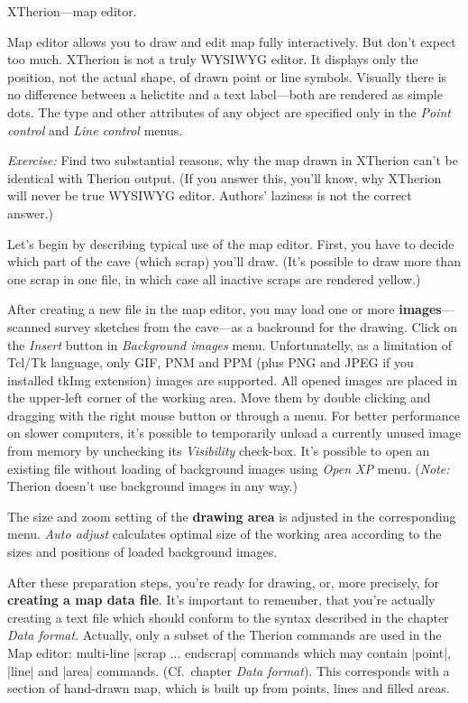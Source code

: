 \subsubchapter XTherion---map editor.

Map editor allows you to draw and edit map fully interactively.
But don't expect too much. XTherion is not a truly WYSIWYG editor. It 
displays only the position, not the actual shape, of drawn point or line 
symbols. Visually there is no difference between a helictite and a text 
label---both are rendered as simple dots. The type and other attributes of any 
object are specified only in the {\it Point control} and {\it Line control} menus.


\ifx\pdfoutput\undefined\else
\leavevmode{}\fi
{\it Exercise:} Find two substantial reasons, why the map drawn in XTherion can't be 
identical with Therion output. (If you answer this, you'll know, why XTherion 
will never be true WYSIWYG editor. Authors' laziness is not the correct 
answer.)

Let's begin by describing typical use of the map editor. First, you have 
to decide which part of the cave (which scrap) you'll draw. (It's possible to 
draw more than one scrap in one file, in which case all inactive scraps are rendered 
yellow.)

After creating a new file in the map editor, you may load one or more 
{\bf images}---scanned survey sketches from the cave---as a backround for 
the drawing. Click on the {\it Insert} button in {\it Background images} menu.
Unfortunatelly, as a limitation of Tcl/Tk language, only GIF, PNM and PPM 
(plus PNG and JPEG if you installed tkImg extension) images are supported. 
All opened images are placed in the upper-left corner of 
the working area. Move them by double clicking and dragging with the right 
mouse button or through a menu. For better performance on slower computers, 
it's possible to temporarily unload a currently unused image from memory 
by unchecking its {\it Visibility} check-box. It's possible to open an existing 
file without loading of background images using {\it Open XP} menu.
({\it Note:} Therion doesn't use background images in any way.)

The size and zoom setting of the {\bf drawing area} is adjusted in the 
corresponding menu. {\it Auto adjust} calculates optimal size of the working 
area according to the sizes and positions of loaded background images.

After these preparation steps, you're ready for drawing, or, more 
precisely, for {\bf creating a map data file}. It's important to remember, 
that you're actually creating a text file which should conform to the syntax 
described in the chapter {\it Data format}. Actually, only a subset of the 
Therion commands are used in the Map editor: multi-line |scrap ... endscrap|
commands which may contain |point|, |line| and |area| commands. (Cf.~chapter 
{\it Data format}). This corresponds with a section of hand-drawn map, which is 
built up from points, lines and filled areas.

